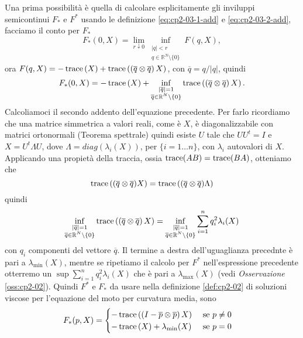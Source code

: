 \begin{enumi}
  \item Una prima possibilità è quella di calcolare esplicitamente gli inviluppi semicontinui $F_*$ e $F^*$ usando le definizione \eqref{eq:cp2-03-1-add} e \eqref{eq:cp2-03-2-add}, facciamo il conto per $F_*$
\[
F_*(0,X)=\lim_{r\downarrow 0}\inf_{\substack{|q|<r \\ q\in \mathbb{R}^N\setminus\{0\}}}F(q,X),
\]
ora $F(q,X)=-\operatorname{trace}\left(X\right)+\operatorname{trace}\left(\left(\overline{q}\otimes\overline{q}\right)X\right)$, con $\overline{q}=q/|q|$, quindi
\[
F_*(0,X)=-\operatorname{trace}\left(X\right)+\inf_{\substack{|\overline{q}|=1 \\ \overline{q}\in \mathbb{R}^N\setminus\{0\}}}\operatorname{trace}\left(\left(\overline{q}\otimes\overline{q}\right)X\right).
\]
Calcoliamoci il secondo addento dell'equazione precedente. Per farlo
ricordiamo che una matrice simmetrica a valori reali, come è $X$, è
diagonalizzabile con matrici ortonormali (Teorema spettrale) quindi
esiste $U$ tale che $UU^t=I$ e $X=U^t\Lambda U$, dove
$\Lambda=diag(\lambda_i(X))$, per ${\{i=1\dots n\}}$, con $\lambda_i$ autovalori di $X$. Applicando una propietà della traccia, ossia $\operatorname{trace}(AB)=\operatorname{trace}(BA)$, otteniamo che 
\[
\operatorname{trace}\left((\overline{q}\otimes\overline{q})X\right)=\operatorname{trace}\left((\overline{q}\otimes\overline{q})\Lambda\right)
\]
quindi
\[
\inf_{\substack{|\overline{q}|=1 \\ \overline{q}\in \mathbb{R}^N\setminus\{0\}}}\operatorname{trace}\left(\left(\overline{q}\otimes\overline{q}\right)X\right) = \inf_{\substack{|\overline{q}|=1 \\ \overline{q}\in \mathbb{R}^N\setminus\{0\}}}\sum_{i=1}^nq_i^2\lambda_i(X)
\]
con $q_i$ componenti del vettore $\overline{q}$. Il termine a destra dell'uguaglianza precednte è pari a $\lambda_{\text{min}}(X)$, mentre se ripetiamo il calcolo per $F^*$ nell'espressione precedente otterremo un $\sup\sum_{i=1}^nq_i^2\lambda_i(X)$ che è pari a $\lambda_{\text{max}}(X)$ (vedi \emph{Osservazione} \ref{oss:cp2-02}).
Quindi $F^*$ e $F_*$ da usare nella definizione \ref{def:cp2-02} di soluzioni viscose per l'equazione del moto per curvatura media, sono
\begin{subequations}
\label{eq:cp2-13}
\begin{align}
  \label{eq:cp2-13-1}%
  F_*(p,X) &=%
  \begin{cases}
   -\trace\left(\left(I-\overline{p}\otimes\overline{p}\right)X\right) &\text{ se } p\ne 0 \\
   -\trace\left(X\right)+\lambda_{\text{min}}(X) & \text{ se }p = 0

\end{cases}
\end{align}
\end{subequations}
\end{enumi}
